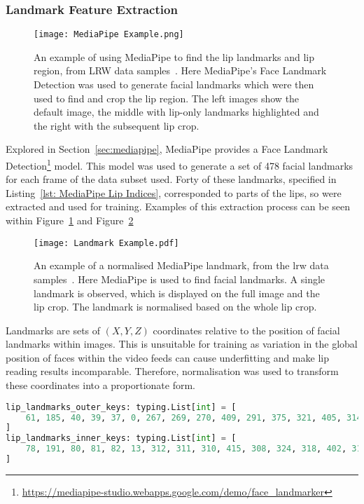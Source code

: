 \subsubsection{Landmark Feature Extraction}
\label{sec: Landmark Feature Extraction}
\begin{figure}
\centering
\texttt{[image: MediaPipe Example.png]}
\caption[An example of using MediaPipe to find the lip landmarks and lip region, from LRW data samples.]{An example of using MediaPipe to find the lip landmarks and lip region, from LRW data samples~\cite{Lip-Reading-In-The-Wild}. Here MediaPipe's Face Landmark Detection was used to generate facial landmarks which were then used to find and crop the lip region. The left images show the default image, the middle with lip-only landmarks highlighted and the right with the subsequent lip crop.}
\label{fig:MediaPipe Example}
\end{figure}
Explored in Section~\ref{sec:mediapipe}, MediaPipe provides a Face Landmark Detection\footnote{\url{https://mediapipe-studio.webapps.google.com/demo/face_landmarker}} model. This model was used to generate a set of 478 facial landmarks for each frame of the data subset used. Forty of these landmarks, specified in Listing~\ref{lst: MediaPipe Lip Indices}, corresponded to parts of the lips, so were extracted and used for training. Examples of this extraction process can be seen within Figure~\ref{fig:MediaPipe Example} and Figure~\ref{fig:Landmark Example}\\
\begin{figure}
\centering
\texttt{[image: Landmark Example.pdf]}
\caption[An example of a normalised MediaPipe landmark]{An example of a normalised MediaPipe landmark, from the \gls{lrw} data samples~\cite{Lip-Reading-In-The-Wild}. Here MediaPipe is used to find facial landmarks. A single landmark is observed, which is displayed on the full image and the lip crop. The landmark is normalised based on the whole lip crop.}
\label{fig:Landmark Example}
\end{figure}
Landmarks are sets of $(X, Y, Z)$ coordinates relative to the position of facial landmarks within images. This is unsuitable for training as variation in the global position of faces within the video feeds can cause underfitting and make lip reading results incomparable. Therefore, normalisation was used to transform these coordinates into a proportionate form.\\
\begin{lstlisting}[language=Python, caption={[A list of the MediaPipe facial landmarks that correspond to the lips.]{A list of the MediaPipe facial landmarks that correspond to the lips. These correspond to the indices visualised within Figure~\ref{fig:mediapipe landmarks} as the facial landmarks associated with the lips.}}, label={lst: MediaPipe Lip Indices}]
lip_landmarks_outer_keys: typing.List[int] = [
    61, 185, 40, 39, 37, 0, 267, 269, 270, 409, 291, 375, 321, 405, 314, 17, 84, 181, 91, 146,
]
lip_landmarks_inner_keys: typing.List[int] = [
    78, 191, 80, 81, 82, 13, 312, 311, 310, 415, 308, 324, 318, 402, 317, 14, 87, 178, 88 95,
]
\end{lstlisting}
